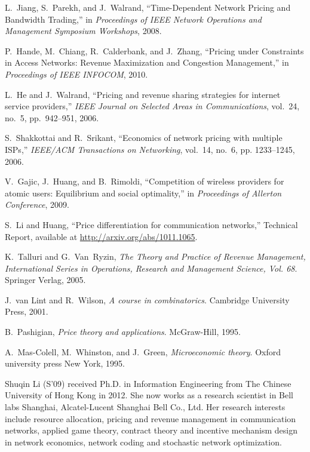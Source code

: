 \documentclass[twocolumn,10pt,twosided]{IEEEtran}
\begin{document}
\begin{thebibliography}{10}
L.~Jiang, S.~Parekh, and J.~Walrand, ``{Time-Dependent Network Pricing and
  Bandwidth Trading},'' in \emph{Proceedings of IEEE Network Operations and Management
  Symposium Workshops}, 2008.

P.~Hande, M.~Chiang, R.~Calderbank, and J.~Zhang, ``{Pricing under Constraints
  in Access Networks: Revenue Maximization and Congestion Management},''
in  \emph{Proceedings of IEEE INFOCOM}, 2010. 

L.~He and J.~Walrand, ``{Pricing and revenue sharing strategies for internet
  service providers},'' \emph{IEEE Journal on Selected Areas in Communications}, vol.~24, no.~5, pp.~942--951, 2006. 

S.~Shakkottai and R.~Srikant, ``{Economics of network pricing with multiple
  ISPs},'' \emph{IEEE/ACM Transactions on Networking}, vol.~14, no.~6,
  pp. 1233--1245, 2006.

V.~Gajic, J.~Huang, and B.~Rimoldi, ``Competition of wireless providers for
  atomic users: Equilibrium and social optimality,'' in \emph{Proceedings of
  Allerton Conference}, 2009.

S.~Li and Huang, ``Price differentiation for communication networks,'' Technical Report, available at
  \url{http://arxiv.org/abs/1011.1065}.



K.~Talluri and G.~Van~Ryzin, \emph{The Theory and Practice of Revenue
  Management, International Series in Operations, Research and Management
  Science, Vol. 68}. Springer Verlag, 2005.


J.~van Lint and R.~Wilson, \emph{{A course in combinatorics}}.  Cambridge University Press, 2001.

B.~Pashigian, \emph{Price theory and applications}. McGraw-Hill, 1995.

A.~Mas-Colell, M.~Whinston, and J.~Green, \emph{Microeconomic theory}. Oxford university press New York, 1995.

\end{thebibliography}




\begin{IEEEbiography}[{\texttt{[image: \{shuqinli]}}}]{Shuqin Li (S'09)} received Ph.D. in Information Engineering from The Chinese University of Hong Kong in 2012. She now works as a research scientist in Bell labs Shanghai, Alcatel-Lucent Shanghai Bell Co., Ltd. Her research interests include resource allocation, pricing and revenue management in communication networks, applied game theory, contract theory and incentive mechanism design in network economics, network coding and stochastic network optimization.
\end{IEEEbiography}
\end{document}
